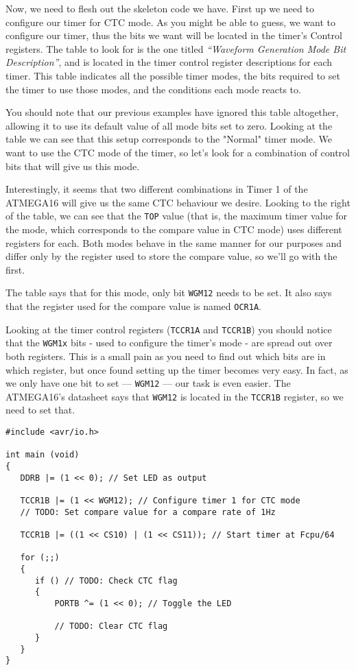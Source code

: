 \documentclass[a4paper,oneside]{book}
\begin{document}
Now, we need to flesh out the skeleton code we have. First up we need to configure our timer for CTC mode. As you might be able to guess, we want to configure our timer, thus the bits we want will be located in the timer's Control registers. The table to look for is the one titled \emph{``Waveform Generation Mode Bit Description''}, and is located in the timer control register descriptions for each timer. This table indicates all the possible timer modes, the bits required to set the timer to use those modes, and the conditions each mode reacts to.

You should note that our previous examples have ignored this table altogether, allowing it to use its default value of all mode bits set to zero. Looking at the table we can see that this setup corresponds to the "Normal" timer mode. We want to use the CTC mode of the timer, so let's look for a combination of control bits that will give us this mode.

Interestingly, it seems that two different combinations in Timer 1 of the ATMEGA16 will give us the same CTC behaviour we desire. Looking to the right of the table, we can see that the \texttt{TOP} value (that is, the maximum timer value for the mode, which corresponds to the compare value in CTC mode) uses different registers for each. Both modes behave in the same manner for our purposes and differ only by the register used to store the compare value, so we'll go with the first.

The table says that for this mode, only bit \texttt{WGM12} needs to be set. It also says that the register used for the compare value is named \texttt{OCR1A}.

Looking at the timer control registers (\texttt{TCCR1A} and \texttt{TCCR1B}) you should notice that the \texttt{WGM1x} bits - used to configure the timer's mode - are spread out over both registers. This is a small pain as you need to find out which bits are in which register, but once found setting up the timer becomes very easy. In fact, as we only have one bit to set --- \texttt{WGM12} --- our task is even easier. The ATMEGA16's datasheet says that \texttt{WGM12} is located in the \texttt{TCCR1B} register, so we need to set that.

\begin{center}
\begin{lstlisting}
#include <avr/io.h>

int main (void)
{
   DDRB |= (1 << 0); // Set LED as output

   TCCR1B |= (1 << WGM12); // Configure timer 1 for CTC mode
   // TODO: Set compare value for a compare rate of 1Hz

   TCCR1B |= ((1 << CS10) | (1 << CS11)); // Start timer at Fcpu/64

   for (;;)
   {
      if () // TODO: Check CTC flag
      {
          PORTB ^= (1 << 0); // Toggle the LED

          // TODO: Clear CTC flag
      }
   }
}
\end{lstlisting}
\end{center}
\end{document}
